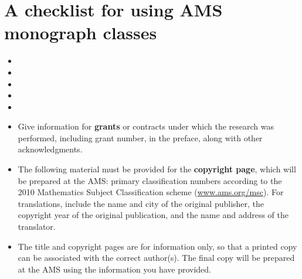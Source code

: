 
\section{A checklist for using AMS monograph classes}\label{sec:scheck}

\begin{itemize}

\item \the\UseDriverFile

 

\item \the\AddHyperref

\item \the\ChapterRight

\item \the\ChapterTitleUC

\item \the\RunHeadMM

\item Give information for \textbf{grants} or contracts under which the
 research was performed, including grant number, in the preface, along
 with other acknowledgments.
 
\item The following material must be provided for the
 \textbf{copyright page}, which will be prepared at the AMS:
 primary classification numbers according to the 2010 Mathematics Subject
 Classification scheme (\url{www.ams.org/msc}).  For translations,
 include the name and city of the original publisher, the copyright year
 of the original publication, and the name and address of the translator.
 
\item The title and copyright pages are for information only, so that
 a printed copy can be associated with the correct author(s).  The final
 copy will be prepared at the AMS using the information you have provided.


\end{itemize}
 
\endinput
